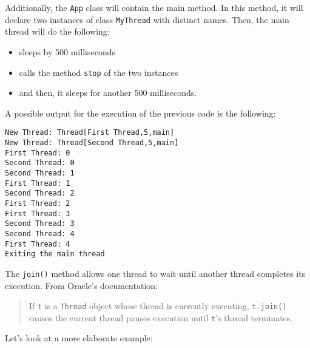 \documentclass{latex/classes/myarticle}
\begin{document}
Additionally, the \texttt{App} class will contain the main method. In this method, it
will declare two instances of class \texttt{MyThread} with distinct names. Then, the
main thread will do the following:

\begin{itemize}
\item sleeps by 500 milliseconds
\item calls the method \texttt{stop} of the two instances
\item and then, it sleeps for another 500 milliseconds.
\end{itemize}

A possible output for the execution of the previous code is the following:

\begin{verbatim}
New Thread: Thread[First Thread,5,main]
New Thread: Thread[Second Thread,5,main]
First Thread: 0
Second Thread: 0
Second Thread: 1
First Thread: 1
Second Thread: 2
First Thread: 2
First Thread: 3
Second Thread: 3
Second Thread: 4
First Thread: 4
Exiting the main thread
\end{verbatim}

The \texttt{join()} method allows one thread to wait until another thread completes
its execution. From Oracle's documentation:

\begin{quote}
If \texttt{t} is a \texttt{Thread} object whose thread is currently executing, \texttt{t.join()}
causes the current thread pauses execution until \texttt{t}'s thread terminates.
\end{quote}

Let's look at a more elaborate example:
\end{document}
